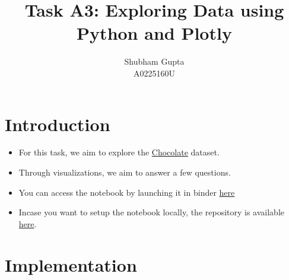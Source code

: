 \documentclass[a4paper]{article}
\title{Task A3: Exploring Data using Python and Plotly}
\author{Shubham Gupta \\ A0225160U}
\begin{document}
\maketitle
\section{Introduction}
\begin{itemize}
    \item For this task, we aim to explore the \href{https://github.com/rfordatascience/tidytuesday/tree/master/data/2022/2022-01-18}{Chocolate} dataset. 
    \item Through visualizations, we aim to answer a few questions.
    \item You can access the notebook by launching it in binder \href{https://mybinder.org/badge_logo.svg)](https://mybinder.org/v2/gh/goodhamgupta/cs5346_task_A3/HEAD?labpath=A0225160U_A3.ipynb}{here}
    \item Incase you want to setup the notebook locally, the repository is available \href{https://github.com/goodhamgupta/cs5346_task_A3}{here}. 
\end{itemize}

\section{Implementation}
\end{document}
